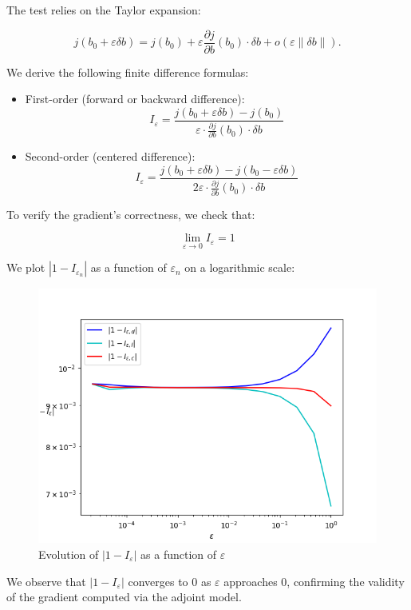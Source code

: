 \documentclass{article}
\begin{document}
The test relies on the Taylor expansion:

\[
j(b_0 + \varepsilon \delta b) = j(b_0) + \varepsilon \frac{\partial j}{\partial b}(b_0) \cdot \delta b + o(\varepsilon \| \delta b \|).
\]

We derive the following finite difference formulas:

\begin{itemize}
    \item First-order (forward or backward difference):
    \[
    I_\varepsilon = \frac{j(b_0 + \varepsilon \delta b) - j(b_0)}{\varepsilon \cdot \frac{\partial j}{\partial b}(b_0) \cdot \delta b}
    \]
    
    \item Second-order (centered difference):
    \[
    I_\varepsilon = \frac{j(b_0 + \varepsilon \delta b) - j(b_0 - \varepsilon \delta b)}{2 \varepsilon \cdot \frac{\partial j}{\partial b}(b_0) \cdot \delta b}
    \]
\end{itemize}

To verify the gradient's correctness, we check that:

\[
\lim_{\varepsilon \to 0} I_\varepsilon = 1
\]

We plot \( \left| 1 - I_{\varepsilon_n} \right| \) as a function of \( \varepsilon_n \) on a logarithmic scale:

\begin{figure}[H]
    \centering
    \includegraphics[width=0.8\linewidth]{Images_Axel/grad2.png}
    \caption{Evolution of \( | 1 - I_\varepsilon | \) as a function of \( \varepsilon \)}
    \label{fig:grad-test}
\end{figure}

We observe that \( | 1 - I_\varepsilon | \) converges to 0 as \( \varepsilon \) approaches 0, confirming the validity of the gradient computed via the adjoint model.
\end{document}
